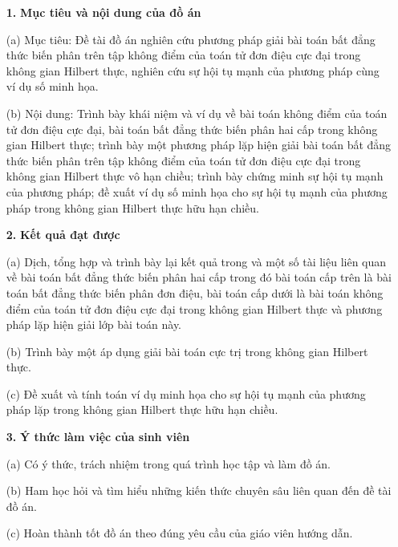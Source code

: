 \documentclass[14pt, oneside,A4paper]{book}
\theoremstyle{plain}
\begin{document}
\fontsize{12pt}{14pt}\selectfont
\begin{enumerate}
	\item [{\bf 1.}]{\bf Mục tiêu và nội dung của đồ án}
		\item[(a)] Mục tiêu: Đề tài đồ án nghiên cứu phương pháp giải bài toán bất đẳng thức biến phân trên tập không điểm của toán tử đơn điệu cực đại trong không gian Hilbert thực, nghiên cứu sự hội tụ mạnh của phương pháp cùng ví dụ số minh họa.
		\item[(b)] Nội dung: Trình bày khái niệm và ví dụ về bài toán không điểm của toán tử đơn điệu cực đại, bài toán bất đẳng thức biến phân hai cấp trong không gian Hilbert thực; trình bày một phương pháp lặp hiện giải bài toán bất đẳng thức biến phân trên tập không điểm của toán tử đơn điệu cực đại trong không gian Hilbert thực vô hạn chiều; trình bày chứng minh sự hội tụ mạnh của phương pháp; đề xuất ví dụ số minh họa cho sự hội tụ mạnh của phương pháp trong không gian Hilbert thực hữu hạn chiều.
	\item [{\bf 2.}] {\bf Kết quả đạt được} 
		\item[(a)] Dịch, tổng hợp và trình bày lại kết quả trong  \cite{BHN} và một số tài liệu liên quan về bài toán bất đẳng thức biến phân hai cấp trong đó bài toán cấp trên là bài toán bất đẳng thức biến phân đơn điệu, bài toán cấp dưới là bài toán không điểm của toán tử đơn điệu cực đại trong không gian Hilbert thực và  phương pháp lặp hiện giải lớp bài toán này.
		\item[(b)] Trình bày một áp dụng giải bài toán cực trị trong không gian Hilbert thực.
		\item[(c)] Đề xuất và tính toán ví dụ minh họa cho sự hội tụ mạnh của phương pháp lặp trong không gian Hilbert thực hữu hạn chiều. 
	\item [{\bf 3.}]{\bf Ý thức làm việc của sinh viên}
		\item[(a)] Có ý thức, trách nhiệm trong quá trình học tập và làm đồ án.
		\item[(b)] Ham học hỏi và tìm hiểu những kiến thức chuyên sâu liên quan đến đề tài đồ án.
		\item[(c)] Hoàn thành tốt đồ án theo đúng yêu cầu của giáo viên hướng dẫn.
\end{enumerate}
\end{document}
